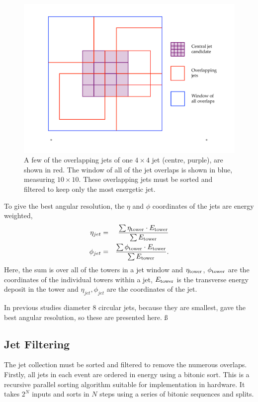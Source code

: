 \begin{figure}[ht!]
\begin{center}
  \includegraphics[scale=0.37]{Figures/l1jets/jetoverlaps}
\caption{A few of the overlapping jets of one $4\times4$ jet (centre, purple), are shown in red. The window of all of the jet overlaps is shown in blue, measuring $10\times10$. These overlapping jets must be sorted and filtered to keep only the most energetic jet.}
\label{slide}
\end{center}
\end{figure}

To give the best angular resolution, the $\eta$ and $\phi$ coordinates of the jets are energy weighted,
\begin{eqnarray}
\eta_{jet} &=& \frac{\sum{\eta_{\rm tower} \cdot E_{\rm tower}} } {\sum{ E_{\rm tower} } }  \\
\phi_{jet} &=& \frac{\sum{\phi_{\rm tower} \cdot E_{\rm tower}} } {\sum{ E_{\rm tower} } } . 
\end{eqnarray}
Here, the sum is over all of the towers in a jet window and $\eta_{\rm tower}$, $\phi_{\rm tower}$ are the coordinates of the individual towers within a jet, $E_{\rm tower}$ is the transverse energy deposit in the tower and $\eta_{jet}, \phi_{jet}$ are the coordinates of the jet.


In previous studies diameter 8 circular jets, because they are smallest, gave the best angular resolution, so these are presented here. ß



\subsection{Jet Filtering} 
The jet collection must be sorted and filtered to remove the numerous overlaps.
Firstly, all jets in each event are ordered in energy using a bitonic sort.
This is a recursive parallel sorting algorithm suitable for implementation in hardware.
It takes $2^N$ inputs and sorts in $N$ steps using a series of bitonic sequences and splits.

